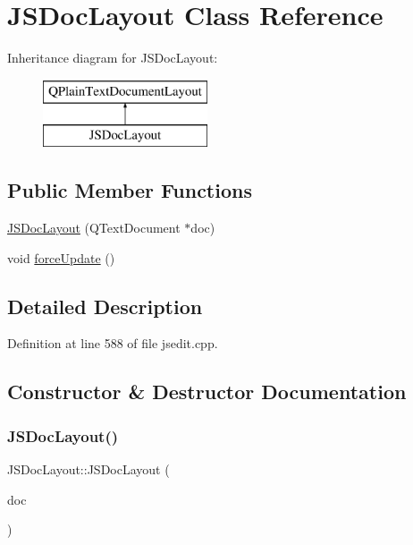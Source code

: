 \hypertarget{class_j_s_doc_layout}{}\section{J\+S\+Doc\+Layout Class Reference}
\label{class_j_s_doc_layout}
Inheritance diagram for J\+S\+Doc\+Layout\+:\begin{figure}[H]
\begin{center}
\leavevmode
\includegraphics[height=2.000000cm]{class_j_s_doc_layout}
\end{center}
\end{figure}
\subsection*{Public Member Functions}
\begin{DoxyCompactItemize}
\item 
\hyperlink{class_j_s_doc_layout_ac36ca8ee49e1346ef73c9128a19731d2}{J\+S\+Doc\+Layout} (Q\+Text\+Document $\ast$doc)
\item 
void \hyperlink{class_j_s_doc_layout_a181d392df06a4e6fca1f38b3a5a86a2c}{force\+Update} ()
\end{DoxyCompactItemize}


\subsection{Detailed Description}


Definition at line 588 of file jsedit.\+cpp.



\subsection{Constructor \& Destructor Documentation}
\mbox{\label{class_j_s_doc_layout_ac36ca8ee49e1346ef73c9128a19731d2}} 
\subsubsection{\texorpdfstring{J\+S\+Doc\+Layout()}{JSDocLayout()}}
{\footnotesize\ttfamily J\+S\+Doc\+Layout\+::\+J\+S\+Doc\+Layout (\begin{DoxyParamCaption}\item[{Q\+Text\+Document $\ast$}]{doc }\end{DoxyParamCaption})}



